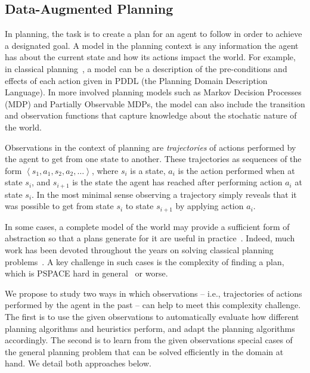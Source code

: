 \documentclass[12pt]{article}
\newcommand{\tuple}[1]{\ensuremath{\left \langle #1 \right \rangle }}
\begin{document}
\subsection{Data-Augmented Planning}

In planning, the task is to create a plan for an agent to follow in order to achieve a designated goal. A model in the planning context is any information the agent has about the current state and how its actions impact the world. For example, in classical planning~\cite{fikes1971strips}, a model can be a description of the pre-conditions and effects of each action given in PDDL (the Planning Domain Description Language). In more involved planning models such as Markov Decision Processes (MDP) and Partially Observable MDPs, the model can also include the transition and observation functions that capture knowledge about the stochatic nature of the world. 


Observations in the context of planning are {\em trajectories} of actions performed by the agent to get from one state to another. These trajectories as sequences of the form $\tuple{ s_1, a_1, s_2, a_2, \ldots}$, where $s_i$ is a state, $a_i$ is the action performed when at state $s_i$, and $s_{i+1}$ is the state the agent has reached after performing action $a_i$ at state $s_i$. In the most minimal sense observing a trajectory simply reveals that it was possible to get from state $s_i$ to state $s_{i+1}$ by applying action $a_i$. %


In some cases, a complete model of the world may provide a sufficient form of abstraction so that a plans generate for it are useful in practice~\cite{ruml2011line}. Indeed, much work has been devoted throughout the years on solving classical planning problems~\cite{ghallab2004automated,borgo2016planning}. A key challenge in such cases is the complexity of finding a plan, which is PSPACE hard in general~\cite{bylander1994computational} or worse. %



We propose to study two ways in which observations -- i.e., trajectories of actions performed by the agent in the past -- can help to meet this complexity challenge. The first is to use the given observations to automatically evaluate how different planning algorithms and heuristics perform, and adapt the planning algorithms accordingly. The second is to learn from the given observations special cases of the general planning problem that can be solved efficiently in the domain at hand. We detail both  approaches below. 
\end{document}
